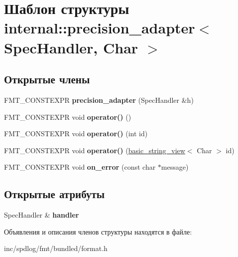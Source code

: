 \hypertarget{structinternal_1_1precision__adapter}{}\section{Шаблон структуры internal\+:\+:precision\+\_\+adapter$<$ Spec\+Handler, Char $>$}
\label{structinternal_1_1precision__adapter}
\subsection*{Открытые члены}
\begin{DoxyCompactItemize}
\item 
\mbox{\label{structinternal_1_1precision__adapter_ad860d39a96f65709f73e96e136d395aa}} 
F\+M\+T\+\_\+\+C\+O\+N\+S\+T\+E\+X\+PR {\bfseries precision\+\_\+adapter} (Spec\+Handler \&h)
\item 
\mbox{\label{structinternal_1_1precision__adapter_a63c4faa71c1b6bfa1555baa09a4669c7}} 
F\+M\+T\+\_\+\+C\+O\+N\+S\+T\+E\+X\+PR void {\bfseries operator()} ()
\item 
\mbox{\label{structinternal_1_1precision__adapter_a8254aec7b64e64ed5cdf3002c8258390}} 
F\+M\+T\+\_\+\+C\+O\+N\+S\+T\+E\+X\+PR void {\bfseries operator()} (int id)
\item 
\mbox{\label{structinternal_1_1precision__adapter_a2c16675ac3d045776c3b3f4da1db5907}} 
F\+M\+T\+\_\+\+C\+O\+N\+S\+T\+E\+X\+PR void {\bfseries operator()} (\hyperlink{classbasic__string__view}{basic\+\_\+string\+\_\+view}$<$ Char $>$ id)
\item 
\mbox{\label{structinternal_1_1precision__adapter_a463e2c71c294aaf98621085afb402294}} 
F\+M\+T\+\_\+\+C\+O\+N\+S\+T\+E\+X\+PR void {\bfseries on\+\_\+error} (const char $\ast$message)
\end{DoxyCompactItemize}
\subsection*{Открытые атрибуты}
\begin{DoxyCompactItemize}
\item 
\mbox{\label{structinternal_1_1precision__adapter_ad82984ec771924019a6df49aff881f67}} 
Spec\+Handler \& {\bfseries handler}
\end{DoxyCompactItemize}


Объявления и описания членов структуры находятся в файле\+:\begin{DoxyCompactItemize}
\item 
inc/spdlog/fmt/bundled/format.\+h\end{DoxyCompactItemize}
